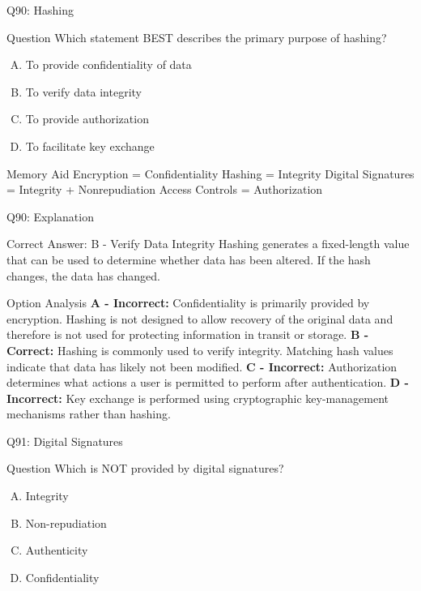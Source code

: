 \documentclass{beamer}
\begin{document}
	\begin{frame}{Q90: Hashing} \begin{block}{Question} Which statement BEST describes the primary purpose of hashing? \end{block} \begin{enumerate}[(A)] \item To provide confidentiality of data \item To verify data integrity \item To provide authorization \item To facilitate key exchange \end{enumerate}  \begin{block}{Memory Aid} Encryption = Confidentiality Hashing = Integrity Digital Signatures = Integrity + Nonrepudiation Access Controls = Authorization \end{block} \end{frame} \begin{frame}{Q90: Explanation} \footnotesize \begin{block}{Correct Answer: B - Verify Data Integrity} Hashing generates a fixed-length value that can be used to determine whether data has been altered. If the hash changes, the data has changed. \end{block} \begin{block}{Option Analysis} \textbf{A - Incorrect:} Confidentiality is primarily provided by encryption. Hashing is not designed to allow recovery of the original data and therefore is not used for protecting information in transit or storage. \vspace{0.15cm} \textbf{B - Correct:} Hashing is commonly used to verify integrity. Matching hash values indicate that data has likely not been modified. \vspace{0.15cm} \textbf{C - Incorrect:} Authorization determines what actions a user is permitted to perform after authentication. \vspace{0.15cm} \textbf{D - Incorrect:} Key exchange is performed using cryptographic key-management mechanisms rather than hashing. \end{block} \end{frame}
	
	\begin{frame}{Q91: Digital Signatures}
		\begin{block}{Question}
			Which is NOT provided by digital signatures?
		\end{block}
		\begin{enumerate}[(A)]
			\item Integrity
			\item Non-repudiation
			\item Authenticity
			\item Confidentiality
		\end{enumerate}
	\end{frame}
	
\end{document}
